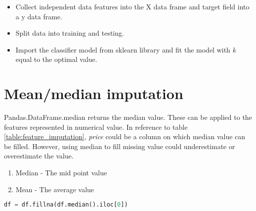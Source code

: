 \begin{itemize}
    \item Collect independent data features into the X data frame and target field into a y data frame.
    \item  Split data into training and testing. 
    \item  Import the classifier model from sklearn library and fit the model with  \textit{k} equal to the optimal value.
\end{itemize}

\section{Mean/median imputation}

Pandas.DataFrame.median \parencite{mckinney-proc-scipy-2010} returns the median value. These can be applied to the features represented in numerical value. In reference to table \ref{table:feature_imputation}, \textit{price} could be a column on which median value can be filled. However, using median to fill missing value could underestimate or overestimate the value.

\begin{enumerate}
    \item Median - The mid point value
    \item Mean - The average value
\end{enumerate}

\begin{lstlisting}[language=Python]
    df = df.fillna(df.median().iloc[0])
\end{lstlisting}